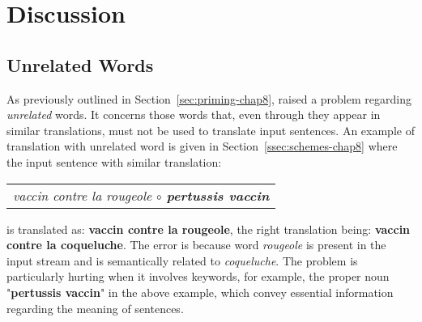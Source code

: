 \begin{table}[ht]
\begin{center}
\end{center}
  \caption{Translation performance for the \texttt{NEWS} and \texttt{WIKI} domain test sets using similar sentences retrieved from parallel data (par) and from both parallel and monolingual (par+mon) data. The first two rows correspond to experiments already shown in Table~\ref{tab:results1-chap8}.}
  \label{tab:results2-chap8}
\end{table}

\section{Discussion}
\label{sec:discussion-chap8}

\subsection*{Unrelated Words} 

As previously outlined in Section~\ref{sec:priming-chap8}, \citet{xu20boosting} raised a problem regarding {\em unrelated} words. 
It concerns those words that, even through they appear in similar translations, must not be used to translate input sentences. 
An example of translation with unrelated word is given in Section~\ref{ssec:schemes-chap8}
%
where the input sentence with similar translation:
\begin{center}
\begin{tabular}{c}
\it vaccin contre la rougeole $\circ$ {\bf pertussis vaccin} \\
\end{tabular}
\end{center}
\noindent is translated as: {\bf vaccin contre la rougeole}, 
the right translation being: {\bf vaccin contre la coqueluche}.
The error is because word \textit{rougeole} is present in the input stream and is semantically related to \textit{coqueluche}.
The problem is particularly hurting when it involves keywords, for example, the proper noun "{\bf pertussis vaccin}" in the above example, which convey essential information regarding the meaning of sentences.

